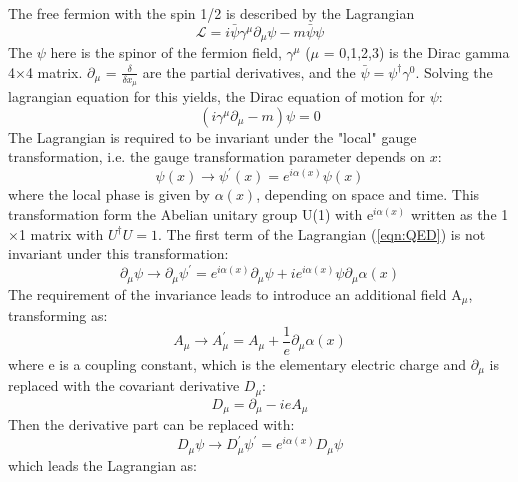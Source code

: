 The free fermion with the spin 1/2 is described by the Lagrangian\\
\begin{equation}
\label{eqn:QED}
\mathcal{L}=i \bar{\psi} \gamma^{\mu} \partial_{\mu} \psi-m \bar{\psi} \psi
\end{equation}
The $\psi$ here is the spinor of the fermion field, $\gamma^{\mu}$  ($\mu$ = 0,1,2,3) is the Dirac gamma 4$\times$4 matrix. $\partial_{\mu}$ = $\frac{\delta}{\delta x_{\mu}}$ are the partial derivatives, and the $\bar{\psi}=\psi^{\dagger} \gamma^{0}$.
Solving the lagrangian equation for this yields, the Dirac equation of motion for $\psi$:
\begin{equation}
\left(i \gamma^{\mu} \partial_{\mu}-m\right) \psi=0
\end{equation}
The Lagrangian is required to be invariant under the "local" gauge transformation, i.e. the gauge transformation parameter depends on $x$:
\begin{equation}
\psi(x) \rightarrow \psi^{\prime}(x)=e^{i \alpha(x)} \psi(x)
\end{equation}
where the local phase is given by $\alpha(x)$, depending on space and time. 
This transformation form the Abelian unitary group U(1) with e$^{i\alpha(x)}$ written as the 1$\times$1 matrix with $U^{\dagger} U=1$.
The first term of the Lagrangian (\ref{eqn:QED}) is not invariant under this transformation:
\begin{equation}
\partial_{\mu} \psi \rightarrow \partial_{\mu} \psi^{\prime}=e^{i \alpha(x)} \partial_{\mu} \psi+i e^{i \alpha(x)} \psi \partial_{\mu} \alpha(x)
\end{equation}
The requirement of the invariance leads to introduce an additional field A$_\mu$, transforming as:
\begin{equation}
A_{\mu} \rightarrow A_{\mu}^{\prime}=A_{\mu}+\frac{1}{e} \partial_{\mu} \alpha(x)
\end{equation}
where e is a coupling constant, which is the elementary electric charge 
and $\partial_{\mu}$ is replaced with the covariant derivative $D_\mu$:
\begin{equation}
D_{\mu}=\partial_{\mu}-i e A_{\mu}
\end{equation}
Then the derivative part can be replaced with:
\begin{equation}
D_{\mu} \psi \rightarrow D_{\mu}^{\prime} \psi^{\prime}=e^{i \alpha(x)} D_{\mu} \psi
\end{equation}
which leads the Lagrangian as:
